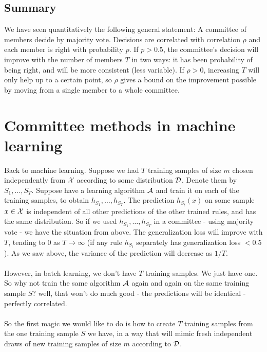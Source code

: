   \subsection{Summary}

We have seen quantitatively the following general statement:
A committee of members decide by majority vote. Decisions are correlated with
correlation $\rho$ and each member is right with probability $p$. If $p>0.5$,
the committee's decision will improve with the number of members $T$ in two
ways: it has been probability of being right, and will be more consistent (less
variable). If $\rho>0$, increasing $T$ will only help up to a certain point, so
$\rho$ gives a bound on the improvement possible by moving from a single member
to a whole committee.
  



  \section{Committee methods in machine learning}

  Back to machine learning. Suppose we had $T$ training samples of size $m$ chosen
independently from $\mathcal{X}$ according to some distribution $\mathcal{D}$. Denote them by 
$S_1,\ldots,S_T$.
Suppose have a learning algorithm $\mathcal{A}$ and train it on each of the training
samples, to obtain $h_{S_1},\ldots, h_{S_T}$. The prediction $h_{S_t}(x)$ on
some sample $x\in\mathcal{X}$ is independent of all other predictions of the other
trained rules, and has the same distribution. So if we used  $h_{S_1},\ldots,
h_{S_T}$ in a committee - using majority vote - we have the situation from above.
The generalization loss will improve with $T$, tending to $0$ as $T\to\infty$
(if any rule $h_{S_t}$ separately has generalization loss $<0.5$).
As we saw above, the variance of the prediction will decrease as $1/T$. 
\\~\\
However, in batch learning, we don't have $T$ training samples. We just have
one. So why not train the same algorithm $\mathcal{A}$ again and again on the same
training sample $S$? well, that won't do much good - the predictions will be
identical - perfectly
correlated. 
\\~\\
So the first magic we would like to do is how to create $T$ training samples from
the one training sample $S$ we have, in a way that will mimic fresh independent
draws of new training samples of size $m$ according to $\mathcal{D}$. 


